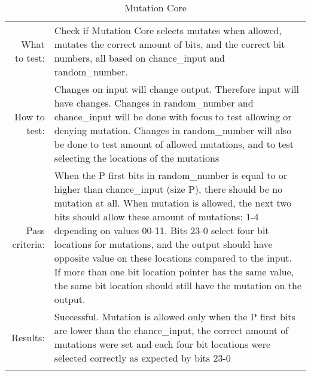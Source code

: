 \begin{table}[H]
  \begin{tabular}{r | p{9cm}}
    \noalign{\smallskip}\hline\noalign{\smallskip}
    
    What to test:  & Check if Mutation Core selects mutates when allowed, mutates the 
                     correct amount of bits, and the correct bit numbers, all based
                     on chance\_input and random\_number.\\

    \noalign{\smallskip}\hline\noalign{\smallskip}

    How to test:   &    Changes on input will change output. Therefore input will have 
                        changes.
                        Changes in random\_number and chance\_input  will be done with
                        focus to test allowing or denying mutation.
                        Changes in random\_number will also be done to test amount of 
                        allowed mutations, and to test selecting the locations of the 
                        mutations
                        \\
                      
    \noalign{\smallskip}\hline\noalign{\smallskip}

    Pass criteria: &    When the P first bits in random\_number is equal to or higher 
                        than chance\_input (size P), there should be no mutation at all.
                        When mutation is allowed, the next two bits should allow these 
                        amount of mutations: 1-4 depending on values 00-11.
                        Bits 23-0 select four bit locations for mutations, and the 
                        output should have opposite value on these locations compared to
                        the input.
                        If more than one bit location pointer has the same value, the 
                        same bit location should still have the mutation on the output.
                                                \\
    \noalign{\smallskip}\hline\noalign{\smallskip}
    
    Results: &      Successful. 
                    Mutation is allowed only when the P first bits are lower than the
                    chance\_input, the correct amount of mutations were set and each 
                    four bit locations were selected correctly as expected by bits 23-0
                    \\
   \noalign{\smallskip}\hline\noalign{\smallskip}
  
  
  \end{tabular}
  \caption{Mutation Core}
  \label{testing:components:genetic_pipeline:mutation_core}
\end{table}
